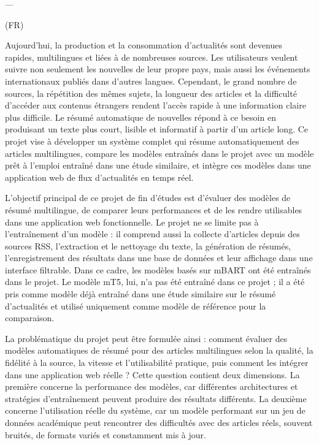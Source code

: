 ---

(FR)

Aujourd’hui, la production et la consommation d’actualités sont devenues rapides, multilingues et liées à de nombreuses sources. Les utilisateurs veulent suivre non seulement les nouvelles de leur propre pays, mais aussi les événements internationaux publiés dans d’autres langues. Cependant, le grand nombre de sources, la répétition des mêmes sujets, la longueur des articles et la difficulté d’accéder aux contenus étrangers rendent l’accès rapide à une information claire plus difficile. Le résumé automatique de nouvelles répond à ce besoin en produisant un texte plus court, lisible et informatif à partir d’un article long. Ce projet vise à développer un système complet qui résume automatiquement des articles multilingues, compare les modèles entraînés dans le projet avec un modèle prêt à l’emploi entraîné dans une étude similaire, et intègre ces modèles dans une application web de flux d’actualités en temps réel.

L’objectif principal de ce projet de fin d’études est d’évaluer des modèles de résumé multilingue, de comparer leurs performances et de les rendre utilisables dans une application web fonctionnelle. Le projet ne se limite pas à l’entraînement d’un modèle : il comprend aussi la collecte d’articles depuis des sources RSS, l’extraction et le nettoyage du texte, la génération de résumés, l’enregistrement des résultats dans une base de données et leur affichage dans une interface filtrable. Dans ce cadre, les modèles basés sur mBART ont été entraînés dans le projet. Le modèle mT5, lui, n’a pas été entraîné dans ce projet ; il a été pris comme modèle déjà entraîné dans une étude similaire sur le résumé d’actualités et utilisé uniquement comme modèle de référence pour la comparaison.

La problématique du projet peut être formulée ainsi : comment évaluer des modèles automatiques de résumé pour des articles multilingues selon la qualité, la fidélité à la source, la vitesse et l’utilisabilité pratique, puis comment les intégrer dans une application web réelle ? Cette question contient deux dimensions. La première concerne la performance des modèles, car différentes architectures et stratégies d’entraînement peuvent produire des résultats différents. La deuxième concerne l’utilisation réelle du système, car un modèle performant sur un jeu de données académique peut rencontrer des difficultés avec des articles réels, souvent bruités, de formats variés et constamment mis à jour.

